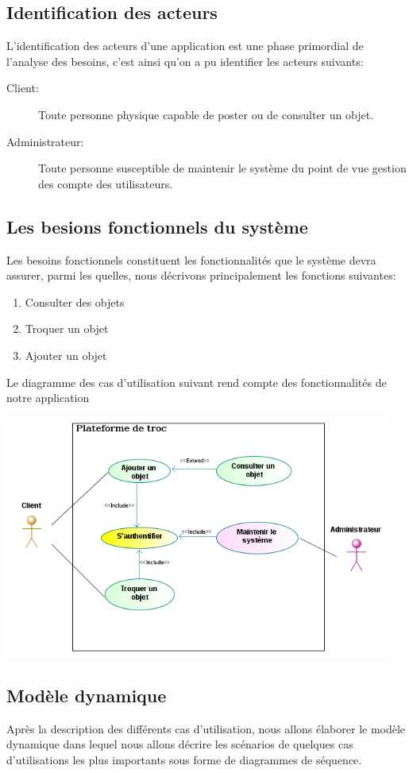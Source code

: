 \documentclass[12pt]{report}
\begin{document}
		\subsection{\sc Identification des acteurs}
		L'identification des acteurs d'une application est une phase primordial de l'analyse des besoins, c'est ainsi qu'on a pu identifier les acteurs suivants:
		\begin{description}
			\item [\sc Client:] Toute personne physique capable de poster ou de consulter un objet.
			\item[\sc Administrateur:] Toute personne susceptible de maintenir le système du point de vue gestion des compte des utilisateurs.
		\end{description}
	\subsection{\sc Les besions fonctionnels du système}
		 Les besoins fonctionnels constituent les fonctionnalités que le système devra assurer, parmi les
		 quelles, nous décrivons principalement les fonctions suivantes: 
		 \begin{enumerate}
		 	\item Consulter des objets
		 	\item Troquer un objet
		 	\item Ajouter un objet
		 \end{enumerate}
		 Le diagramme des cas d'utilisation suivant rend compte des fonctionnalités de notre application
			\begin{center}
				\includegraphics[scale=1, width=\textwidth, height=8cm]{usecase}
				\label{usecase}
			\end{center}
		\subsection{\sc Modèle dynamique}
			Après la description des différents cas d’utilisation, nous allons élaborer le modèle dynamique
			dans lequel nous allons décrire les scénarios de quelques cas d’utilisations les plus importants sous forme de diagrammes de séquence.
			
\end{document}
